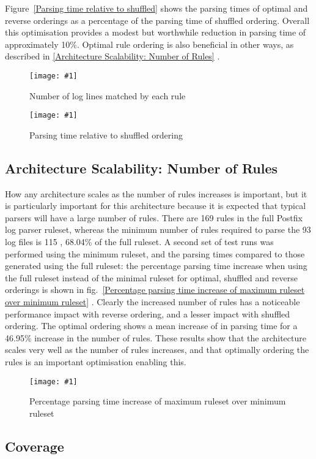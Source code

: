 \documentclass{svmult}
\newcommand{\showgraph}[3]{%
    \begin{figure}[btp]%
        \texttt{[image: \#1]}%
        \caption{#2}\label{#3}%
    \end{figure}%
}
\newcommand{\sectionref}[1]{%
    \textsection{}\vref*{#1}%
}
\newcommand{\refwithlabel}[2]{%
    #1~\vref{#2}%
}
\newcommand{\graphref}[1]{%
    \refwithlabel{fig.}{#1}%
}
\newcommand{\Graphref}[1]{%
    \refwithlabel{Figure}{#1}%
}
\newcommand{\numberOFlogFILES}[0]{%
    93%
}
\newcommand{\numberOFrules}[0]{%
    169%
}
\newcommand{\numberOFrulesMINIMUM}[0]{%
    115%
}
\newcommand{\numberOFrulesMINIMUMpercentage}[0]{%
    68.04\%%
}
\newcommand{\numberOFrulesMAXIMUMpercentage}[0]{%
    46.95\%%
}
\begin{document}
\Graphref{Parsing time relative to shuffled} shows the parsing times of
optimal and reverse orderings as a percentage of the parsing time of
shuffled ordering.  Overall this optimisation provides a modest but
worthwhile reduction in parsing time of approximately 10\%.  Optimal rule
ordering is also beneficial in other ways, as described in
\sectionref{Architecture Scalability: Number of Rules}.
\showgraph{build/graph-hits}{Number of log lines matched by each rule}{rule
hits graph} \showgraph{build/graph-optimal-and-reverse-vs-shuffle}{Parsing
time relative to shuffled ordering}{Parsing time relative to shuffled}

\subsection{Architecture Scalability: Number of Rules}

\label{Architecture Scalability: Number of Rules}

How any architecture scales as the number of rules increases is important,
but it is particularly important for this architecture because it is
expected that typical parsers will have a large number of rules.  There are
\numberOFrules{} rules in the full Postfix log parser ruleset, whereas the
minimum number of rules required to parse the \numberOFlogFILES{} log files
is \numberOFrulesMINIMUM{}, \numberOFrulesMINIMUMpercentage{} of the full
ruleset.  A second set of test runs was performed using the minimum
ruleset, and the parsing times compared to those generated using the full
ruleset: the percentage parsing time increase when using the full ruleset
instead of the minimal ruleset for optimal, shuffled and reverse orderings
is shown in \graphref{Percentage parsing time increase of maximum ruleset
over minimum ruleset}.  Clearly the increased number of rules has a
noticeable performance impact with reverse ordering, and a lesser impact
with shuffled ordering.  The optimal ordering shows a mean increase of
 in parsing time for a
\numberOFrulesMAXIMUMpercentage{} increase in the number of rules.  These
results show that the architecture scales very well as the number of rules
increases, and that optimally ordering the rules is an important
optimisation enabling this.
\showgraph{build/graph-full-ruleset-vs-minimum-ruleset}{Percentage parsing
time increase of maximum ruleset over minimum ruleset}{Percentage parsing
time increase of maximum ruleset over minimum ruleset}

\subsection{Coverage}
\end{document}
